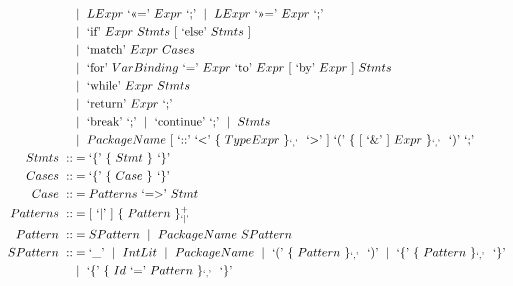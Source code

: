 \documentclass[letterpaper]{article}
\newcommand{\nonterminal}[1]{#1\ }
\newcommand{\terminal}[1]{\text{`#1'}\ }
\newcommand{\gramOption}[1]{[\ #1]\ }
\newcommand*{\gramRepeat}[2][]{\{\ #2\}_{#1}\ }
\newcommand*{\gramSome}[2][]{\{\ #2\}^{+}_{#1}\ }
\newcommand{\gramOr}{\mid\ }
\begin{document}
\begin{align*}
    &\gramOr \nonterminal{LExpr} \terminal{\textless\textless=} \nonterminal{Expr} \terminal{;}
     \gramOr \nonterminal{LExpr} \terminal{\textgreater\textgreater=} \nonterminal{Expr} \terminal{;} \\
    &\gramOr \terminal{if} \nonterminal{Expr} \nonterminal{Stmts}
      \gramOption{\terminal{else} \nonterminal{Stmts}} \\
    &\gramOr \terminal{match} \nonterminal{Expr} \nonterminal{Cases} \\
    &\gramOr \terminal{for}
      \nonterminal{VarBinding} \terminal{=} \nonterminal{Expr}
      \terminal{to} \nonterminal{Expr}
      \gramOption{\terminal{by} \nonterminal{Expr}} \nonterminal{Stmts} \\
    &\gramOr \terminal{while} \nonterminal{Expr} \nonterminal{Stmts} \\
    &\gramOr \terminal{return} \nonterminal{Expr} \terminal{;} \\
    &\gramOr \terminal{break} \terminal{;}
     \gramOr \terminal{continue} \terminal{;}
     \gramOr \nonterminal{Stmts} \\
    &\gramOr \nonterminal{PackageName}
      \gramOption{\terminal{::} \terminal{\textless}
        \gramRepeat[\terminal{,}]{\nonterminal{TypeExpr}} \terminal{\textgreater}}
      \terminal{(} \gramRepeat[\terminal{,}]{\gramOption{\terminal{\&}} \nonterminal{Expr}} \terminal{)} \terminal{;} \\
%
  \nonterminal{Stmts} ::&=
    \terminal{\{} \gramRepeat{\nonterminal{Stmt}} \terminal{\}} \\
%
  \nonterminal{Cases} ::&=
    \terminal{\{} \gramRepeat{\nonterminal{Case}} \terminal{\}} \\
%
  \nonterminal{Case} ::&=
    \nonterminal{Patterns} \terminal{=\textgreater} \nonterminal{Stmt} \\
%
  \nonterminal{Patterns} ::&=
    \gramOption{\terminal{\textbar}}
      \gramSome[\terminal{\textbar}]{\nonterminal{Pattern}} \\
%
  \nonterminal{Pattern} ::&= \nonterminal{SPattern}
    \gramOr \nonterminal{PackageName} \nonterminal{SPattern} \\
%
  \nonterminal{SPattern} ::&= \terminal{\textunderscore}
    \gramOr \nonterminal{IntLit} \gramOr \nonterminal{PackageName}
    \gramOr \terminal{(} \gramRepeat[\terminal{,}]{\nonterminal{Pattern}} \terminal{)}
    \gramOr \terminal{\{} \gramRepeat[\terminal{,}]{\nonterminal{Pattern}} \terminal{\}} \\
    &\gramOr \terminal{\{}
      \gramRepeat[\terminal{,}]{\nonterminal{Id} \terminal{=} \nonterminal{Pattern}} \terminal{\}} \\

\end{align*}
\end{document}
